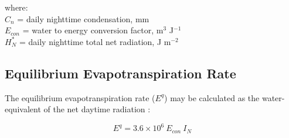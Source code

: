\noindent where: \\
\indent $C_n$ = daily nighttime condensation, mm\\
\indent $E_{con}$ = water to energy conversion factor, m$^{3}$ J$^{-1}$\\
\indent $H_N^{\ast}$ = daily nighttime total net radiation, J m$^{-2}$\\

\subsection{Equilibrium Evapotranspiration Rate}
\label{sec:eet}
The equilibrium evapotranspiration rate ($E^q$) may be calculated as the water-equivalent of the net daytime radiation \parencite[Eq. 5]{prentice93}:

\begin{equation}
\label{eq:eet}
	E^q = 3.6\times 10^6\: E_{con}\: I_N
\end{equation}

